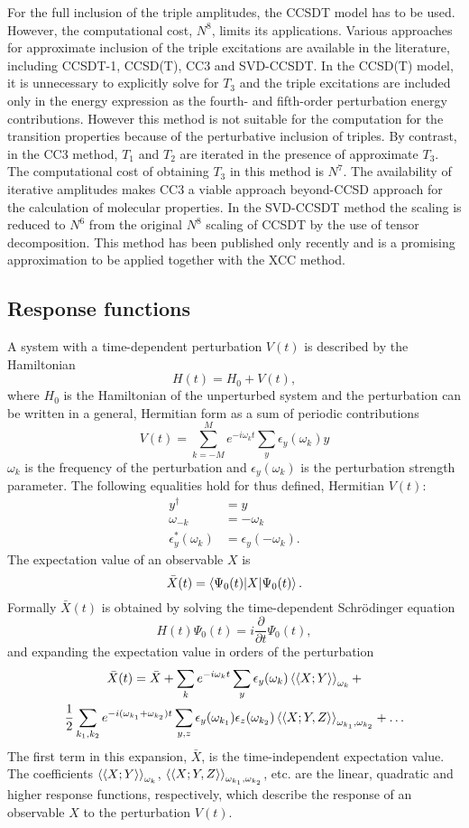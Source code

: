\documentclass[preprint,12pt]{elsarticle}
\newcommand{\equ}[1]{\begin{equation} #1 \end{equation}}
\newcommand{\equl}[2]{\begin{equation}\label{#2} #1 \end{equation}}
\newcommand{\equml}[2]{\begin{multline}\label{#2} #1 \end{multline}}
\newcommand{\equa}[1]{\begin{align} #1 \end{align}}
\newcommand{\odpk}{\braket{\braket{X;Y}}_{\omega_k}}
\newcommand{\quadrak}{\braket{\braket{X;Y,Z}}_{\omega_{k_1}, \omega_{k_2}}}
\begin{document}
For the full inclusion of the triple amplitudes, the CCSDT model\cite{noga1987j, noga1988erratum, scuseria1988new} has to be used.
However, the computational cost,
 $N^8$, limits its applications.
Various approaches for approximate inclusion
of the triple excitations are available in the literature,
including CCSDT-1,\cite{lee1984coupled, urban1985towards, noga1987towards}
CCSD(T),\cite{raghavachari1989fifth} CC3\cite{koch1997cc3} and SVD-CCSDT.\cite{lesiuk2019implementation}
In the CCSD(T) model, it is unnecessary to  explicitly solve for $T_3$ and the triple excitations are  included only
in the energy expression as the fourth- and fifth-order perturbation energy contributions.
 However this method is not suitable for the computation for the transition properties because of the perturbative inclusion
 of triples. By contrast,
 in the CC3 method, $T_1$ and $T_2$ are
 iterated in the presence of approximate $T_3$. The computational cost of obtaining  $T_3$ in this method is $N^7$. The availability of iterative amplitudes
 makes CC3 a viable approach beyond-CCSD approach for the calculation of molecular properties. In the SVD-CCSDT method the scaling is reduced to $N^6$
 from the original $N^8$ scaling of CCSDT by the use of tensor decomposition. This method has been
 published only recently and is a promising approximation to be applied together with the XCC method.

\subsection{Response functions}
A system with a time-dependent perturbation $V(t)$ is described by the Hamiltonian
\equl{H(t) = H_0 + V(t),
}{ht}
where $H_0$ is the Hamiltonian of the unperturbed system and the perturbation can be written in a general, Hermitian
form as a sum of periodic contributions\cite{christiansen1998response} 
\equl{V(t) = \sum_{k=-M}^M e^{-i\omega_k t}\sum_y \epsilon_y (\omega_k) y
}{zab}
$\omega_k$ is the frequency of the perturbation and $\epsilon_y(\omega_k)$ is the perturbation strength parameter.
The following equalities hold for thus defined, Hermitian $V(t)$:
\equa{
  y^\dagger &= y\\
\omega_{-k} &= -\omega_k\\
\epsilon_y^*(\omega_k) &= \epsilon_y(-\omega_k).
}
The expectation value of an observable $X$ is
\equ{\bar{X}(t) = \braket{\Psi_0(t)|X|\Psi_0(t)}.}
 Formally $\bar{X}(t)$ is obtained by solving the time-dependent Schr\"{o}dinger equation 
\equl{H(t) \Psi_0(t) = i \frac{\partial}{\partial t} \Psi_0(t),
}{tds}
and expanding the expectation value  in orders of the perturbation
\equml{\bar{X}(t) = \bar{X} +\sum_{k} e^{-i\omega_k t}\sum_y \epsilon_y (\omega_k) \odpk +\\
  \frac12\sum_{k_1, k_2} e^{-i(\omega_{k_1}+\omega_{k_2}) t}\sum_{y,z} \epsilon_y (\omega_{k_1})\epsilon_z (\omega_{k_2}) \quadrak + \ldots
}{pert-exp}
The first term in this expansion, $\bar{X}$, is the time-independent expectation value. The coefficients $\odpk$, $\quadrak $, etc.
are the linear, quadratic and higher response functions, respectively, which 
describe the response of an observable $X$ to the perturbation $V(t)$.
\end{document}
